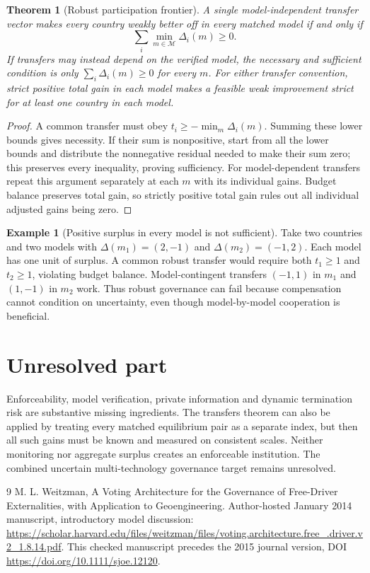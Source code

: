 \documentclass[11pt]{article}
\newtheorem{theorem}{Theorem}
\theoremstyle{definition}
\newtheorem{example}{Example}
\begin{document}
\begin{theorem}[Robust participation frontier]
A single model-independent transfer vector makes every country weakly better off in every matched model if and only if
\[
 \sum_i\min_{m\in\mathcal M}\Delta_i(m)\geq0.
\]
If transfers may instead depend on the verified model, the necessary and sufficient condition is only $\sum_i\Delta_i(m)\geq0$ for every $m$. For either transfer convention, strict positive total gain in each model makes a feasible weak improvement strict for at least one country in each model.
\end{theorem}
\begin{proof}
A common transfer must obey $t_i\geq-\min_m\Delta_i(m)$. Summing these lower bounds gives necessity. If their sum is nonpositive, start from all the lower bounds and distribute the nonnegative residual needed to make their sum zero; this preserves every inequality, proving sufficiency. For model-dependent transfers repeat this argument separately at each $m$ with its individual gains. Budget balance preserves total gain, so strictly positive total gain rules out all individual adjusted gains being zero.
\end{proof}

\begin{example}[Positive surplus in every model is not sufficient]
Take two countries and two models with $\Delta(m_1)=(2,-1)$ and $\Delta(m_2)=(-1,2)$. Each model has one unit of surplus. A common robust transfer would require both $t_1\geq1$ and $t_2\geq1$, violating budget balance. Model-contingent transfers $(-1,1)$ in $m_1$ and $(1,-1)$ in $m_2$ work. Thus robust governance can fail because compensation cannot condition on uncertainty, even though model-by-model cooperation is beneficial.
\end{example}

\section*{Unresolved part}
Enforceability, model verification, private information and dynamic termination risk are substantive missing ingredients. The transfers theorem can also be applied by treating every matched equilibrium pair as a separate index, but then all such gains must be known and measured on consistent scales. Neither monitoring nor aggregate surplus creates an enforceable institution. The combined uncertain multi-technology governance target remains unresolved.
\begin{thebibliography}{9}
 M. L. Weitzman, A Voting Architecture for the Governance of Free-Driver Externalities, with Application to Geoengineering. Author-hosted January 2014 manuscript, introductory model discussion: \url{https://scholar.harvard.edu/files/weitzman/files/voting.architecture.free_.driver.v2_1.8.14.pdf}. This checked manuscript precedes the 2015 journal version, DOI \url{https://doi.org/10.1111/sjoe.12120}.
\end{thebibliography}
\end{document}
